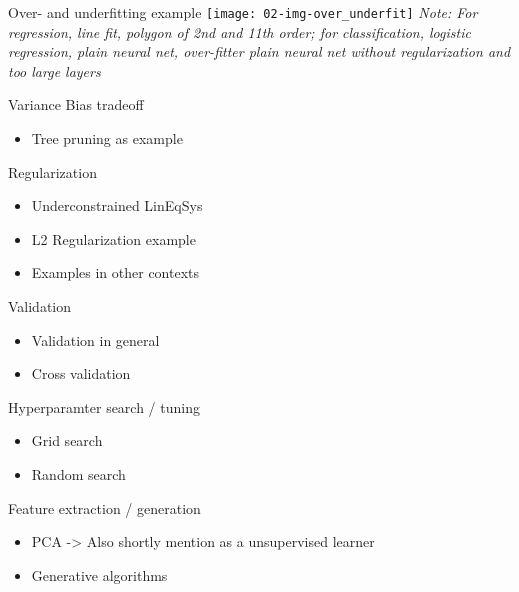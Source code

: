     \begin{frame}{Over- and underfitting example}
      \texttt{[image: 02-img-over\_underfit]}
      \enlargethispage{3em}
      \emph{\footnotesize Note: For regression, line fit, polygon of 2nd and 11th order; for classification, logistic regression, plain neural net, over-fitter plain neural net without regularization and too large layers}
    \end{frame}

    \begin{frame}{Variance Bias tradeoff}
      \begin{itemize}
        \item Tree pruning as example
      \end{itemize}
    \end{frame}

    \begin{frame}{Regularization}
      \begin{itemize}
        \item Underconstrained LinEqSys
        \item L2 Regularization example
        \item Examples in other contexts
      \end{itemize}
    \end{frame}

    \begin{frame}{Validation}
      \begin{itemize}
        \item Validation in general
        \item Cross validation
      \end{itemize}
    \end{frame}

    \begin{frame}{Hyperparamter search / tuning}
      \begin{itemize}
        \item Grid search
        \item Random search
      \end{itemize}
    \end{frame}

    \begin{frame}{Feature extraction / generation}
      \begin{itemize}
        \item PCA -> Also shortly mention as a unsupervised learner
        \item Generative algorithms
      \end{itemize}
    \end{frame}

